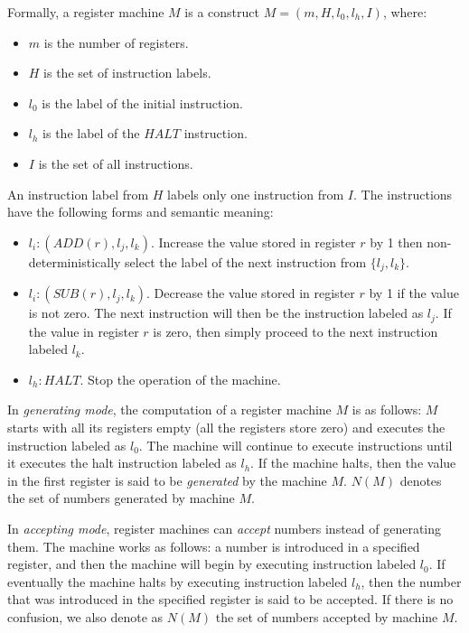 \documentclass[smallextended]{svjour3}
\begin{document}
Formally, a register machine $M$ is a construct $M = (m, H, l_0, l_h, I)$, where:
  
\begin{itemize}  
   \item $m$ is the number of registers.    
   \item $H$ is the set of instruction labels.    
   \item $l_0$ is the label of the initial instruction.
   \item $l_h$ is the label of the $HALT$ instruction.
   \item $I$ is the set of all instructions.    
\end{itemize}

An instruction label from $H$ labels only one instruction from $I$. The instructions have the following forms and semantic meaning:

\begin{itemize}
   \item $l_i: (ADD(r),l_j,l_k)$. Increase the value stored in register $r$ by 1 then non-deterministically select the label of the next instruction
         from $\{l_j,l_k\}$.         
   \item $l_i: (SUB(r),l_j,l_k)$. Decrease the value stored in register $r$ by 1 if the value is not zero. The next instruction will then be the 
         instruction labeled as $l_j$. If the value in register $r$ is zero, then simply proceed to the next instruction labeled $l_k$.
   \item $l_h: HALT$. Stop the operation of the machine.
\end{itemize}
  
In \textit{generating mode}, the computation of a register machine $M$ is as follows: $M$ starts with all its registers empty (all the registers store
zero) and executes the instruction labeled as $l_0$. The machine will continue to execute instructions until it executes the halt instruction labeled
as $l_h$. If the machine halts, then the value in the first register is said to be \textit{generated} by the machine $M.$ $N(M)$ denotes the set of 
numbers generated by machine $M.$ 
  
In \textit{accepting mode}, register machines can \textit{accept} numbers instead of generating them. The machine works as follows: a number is 
introduced in a specified register, and then the machine will begin by executing instruction labeled $l_0$. If eventually the machine halts by 
executing instruction labeled $l_h$, then the number that was introduced in the specified register is said to be accepted. If there is no confusion, 
we also denote as $N(M)$ the set of numbers accepted by machine $M.$
\end{document}
